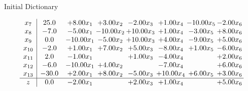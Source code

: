 \documentclass[8pt]{article}
\begin{document}
Initial Dictionary 

\[\begin{array}{c| c c@{\hskip 2pt} c@{\hskip 2pt} c@{\hskip 2pt} c@{\hskip 2pt} c@{\hskip 2pt} c@{\hskip 2pt} }
 x_{7}   &  25.0 & +  8.00 x_{1} & +  3.00 x_{2} & -2.00 x_{3} & +  1.00 x_{4} & -10.00 x_{5} & -2.00 x_{6}\\
 x_{8}   &  -7.0 & -5.00 x_{1} & -10.00 x_{2} & + 10.00 x_{3} & +  1.00 x_{4} & -3.00 x_{5} & +  8.00 x_{6}\\
 x_{9}   &  0.0 & -10.00 x_{1} & -5.00 x_{2} & + 10.00 x_{3} & +  4.00 x_{4} & -9.00 x_{5} & +  5.00 x_{6}\\
 x_{10}   &  -2.0 & +  1.00 x_{1} & +  7.00 x_{2} & +  5.00 x_{3} & -8.00 x_{4} & +  1.00 x_{5} & -6.00 x_{6}\\
 x_{11}   &  2.0 & -1.00 x_{1} &   & +  1.00 x_{3} & -4.00 x_{4} &   & +  2.00 x_{6}\\
 x_{12}   &  -6.0 & -10.00 x_{1} & +  4.00 x_{2} &   & -7.00 x_{4} &   & +  6.00 x_{6}\\
 x_{13}   &  -30.0 & +  2.00 x_{1} & +  8.00 x_{2} & -5.00 x_{3} & + 10.00 x_{4} & +  6.00 x_{5} & +  3.00 x_{6}\\
\hline
z    &  0.0 & -2.00 x_{1} &   & +  2.00 x_{3} & +  1.00 x_{4} &   & +  5.00 x_{6}\\
\end{array}\]
\end{document}
